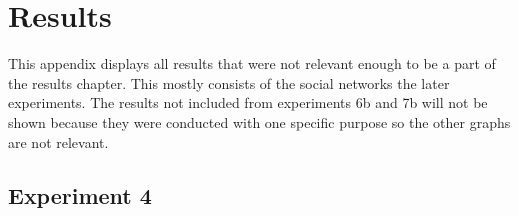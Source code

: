 \chapter{Results}\label{AppendixA}
This appendix displays all results that were not relevant enough to be a part of the results chapter. This mostly consists of the social networks the later experiments. The results not included from experiments 6b and 7b will not be shown because they were conducted with one specific purpose so the other graphs are not relevant.

\section{Experiment 4}

\begin{figure}
    \hfill
    \par \bigskip

\end{figure}

